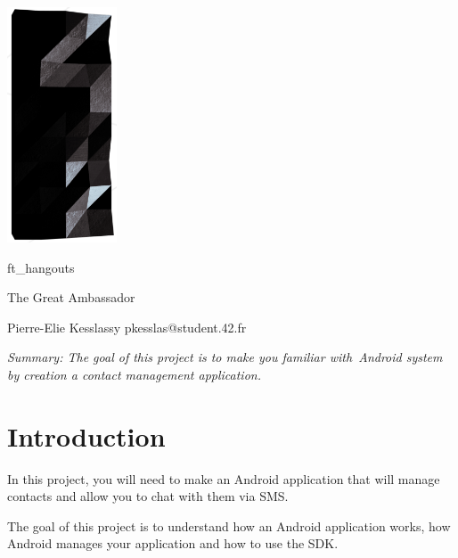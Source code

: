 \usepackage{graphicx}
\usepackage{color}




\begin{titlepage}

	\centering
	\includegraphics{logo.png}

	\vspace{2\baselineskip}

	\LARGE{\textmd{ft\_hangouts}}
	\normalsize

	\LARGE{\textmd{The Great Ambassador}}
	\normalsize

	\vspace{2\baselineskip}

	Pierre-Elie Kesslassy pkesslas@student.42.fr

	\vspace{6\baselineskip}

	\textit{Summary: The goal of this project is to make you familiar with\
	Android system by creation a contact management application.}

	\pagestyle{empty}

\end{titlepage}

\tableofcontents

\pagestyle{empty}


\raggedright

\section{Introduction}

In this project, you will need to make an Android application that will manage contacts and allow you to chat with them via SMS\@.

The goal of this project is to understand how an Android application works, how Android manages your application and how to use the SDK\@.

